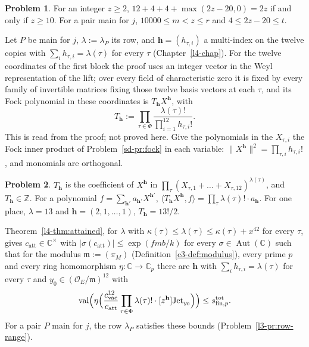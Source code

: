 \documentclass[reqno]{amsart}
\newcounter{chap}
\theoremstyle{definition}
\newtheorem{problem}{Problem}[section]
\theoremstyle{plain}
\theoremstyle{remark}
\newcommand{\Z}{\mathbb{Z}}
\newcommand{\C}{\mathbb{C}}
\newcommand{\Aut}{\operatorname{Aut}}
\newcommand{\val}{\operatorname{val}}
\newcommand{\stot}[1]{s^{\mathrm{tot}}_{\mathrm{fin},#1}}
\newcommand{\catt}{c_{\mathrm{att}}}
\newcommand{\cvac}{c_{\mathrm{vac}}}
\newcommand{\Jet}{\mathrm{Jet}}
\newcommand{\hb}{{\mathbf{h}}}
\begin{document}
\begin{problem}\label{pr:blocks}
For an integer \(z \ge 2\), \(12 + 4 + 4 + \max(2z - 20, 0) = 2z\) if and only if \(z \ge 10\).  For a pair main for \(j\), \(10000 \le m < z \le r\) and \(4 \le 2z - 20 \le t\).
\end{problem}

Let \(P\) be main for \(j\), \(\lambda := \lambda_P\) its row, and \(\hb = (h_{\tau,i})\) a multi-index on the twelve copies with \(\sum_i h_{\tau,i} = \lambda(\tau)\) for every \(\tau\) (Chapter~\ref{l4-chap}).  For the twelve coordinates of the first block the proof uses an integer vector in the Weyl representation of the lift; over every field of characteristic zero it is fixed by every family of invertible matrices fixing those twelve basis vectors at each \(\tau\), and its Fock polynomial in these coordinates is \(T_\hb X^\hb\), with
\[
  T_\hb := \prod_{\tau\in\Phi}\frac{\lambda(\tau)!}{\prod_{i=1}^{12} h_{\tau,i}!} .
\]
This is read from the proof; not proved here.  Give the polynomials in the \(X_{\tau,i}\) the Fock inner product of Problem~\ref{sd-pr:fock} in each variable: \(\lVert X^\hb\rVert^2 = \prod_{\tau,i}h_{\tau,i}!\), and monomials are orthogonal.

\begin{problem}\label{pr:multinomial}
\(T_\hb\) is the coefficient of \(X^\hb\) in \(\prod_\tau (X_{\tau,1} + \dots + X_{\tau,12})^{\lambda(\tau)}\), and \(T_\hb \in \Z\).  For a polynomial \(f = \sum_{\hb'} a_{\hb'} X^{\hb'}\), \(\langle T_\hb X^\hb, f\rangle = \prod_\tau \lambda(\tau)! \cdot a_\hb\).  For one place, \(\lambda = 13\) and \(\hb = (2, 1, \dots, 1)\), \(T_\hb = 13!/2\).
\end{problem}

Theorem~\ref{l4-thm:attained}, for \(\lambda\) with \(\kappa(\tau) \le \lambda(\tau) \le \kappa(\tau) + x^{42}\) for every \(\tau\), gives \(\catt \in \C^\times\) with \(\lvert\sigma(\catt)\rvert \le \exp(fmb/k)\) for every \(\sigma \in \Aut(\C)\) such that for the modulus \(\mathfrak m := (\pi_M)\) (Definition~\ref{c3-def:modulus}), every prime \(p\) and every ring homomorphism \(\eta\colon\C\to\C_p\) there are \(\hb\) with \(\sum_i h_{\tau,i} = \lambda(\tau)\) for every \(\tau\) and \(y_0 \in (\mathcal O_E/\mathfrak m)^{12}\) with
\[
  \val\Bigl(\eta\Bigl(\frac{\cvac^{12}}{\catt}\prod_{\tau\in\Phi}\lambda(\tau)!\cdot[z^\hb]\Jet_{y_0}\Bigr)\Bigr) \le \stot p .
\]
For a pair \(P\) main for \(j\), the row \(\lambda_P\) satisfies these bounds (Problem~\ref{l3-pr:row-range}).
\end{document}
